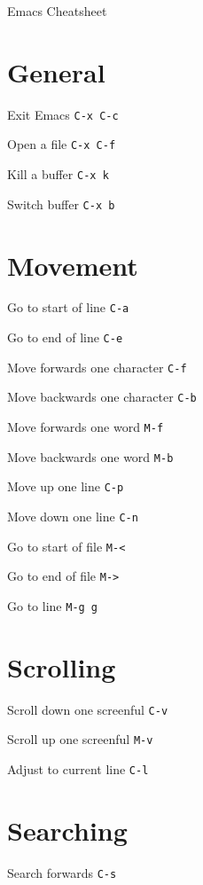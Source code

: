 \documentclass[12pt,a4paper]{article}
\newcommand{\keyboardshortcut}[2]{#1 \hfill \texttt{#2}}
\begin{document}
\begin{center}{\Huge Emacs Cheatsheet}\end{center}

\section*{General}

\keyboardshortcut{Exit Emacs}{C-x C-c}

\keyboardshortcut{Open a file}{C-x C-f}

\keyboardshortcut{Kill a buffer}{C-x k}

\keyboardshortcut{Switch buffer}{C-x b}


\section*{Movement}

\keyboardshortcut{Go to start of line}{C-a}

\keyboardshortcut{Go to end of line}{C-e}

\keyboardshortcut{Move forwards one character}{C-f}

\keyboardshortcut{Move backwards one character}{C-b}

\keyboardshortcut{Move forwards one word}{M-f}

\keyboardshortcut{Move backwards one word}{M-b}

\keyboardshortcut{Move up one line}{C-p}

\keyboardshortcut{Move down one line}{C-n}

\keyboardshortcut{Go to start of file}{M-<}

\keyboardshortcut{Go to end of file}{M->}

\keyboardshortcut{Go to line}{M-g g}


\section*{Scrolling}

\keyboardshortcut{Scroll down one screenful}{C-v}

\keyboardshortcut{Scroll up one screenful}{M-v}

\keyboardshortcut{Adjust to current line}{C-l}


\section*{Searching}

\keyboardshortcut{Search forwards}{C-s}
\end{document}
